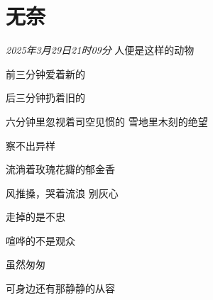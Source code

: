 \section*{无奈}
\begin{center}
\textit{2025年3月29日21时09分}\hh 
人便是这样的动物

前三分钟爱着新的

后三分钟扔着旧的

六分钟里忽视着司空见惯的\hh
雪地里木刻的绝望

察不出异样

流淌着玫瑰花瓣的郁金香

风推搡，哭着流浪\hh
别灰心

走掉的是不忠

喧哗的不是观众

虽然匆匆

可身边还有那静静的从容
\end{center}